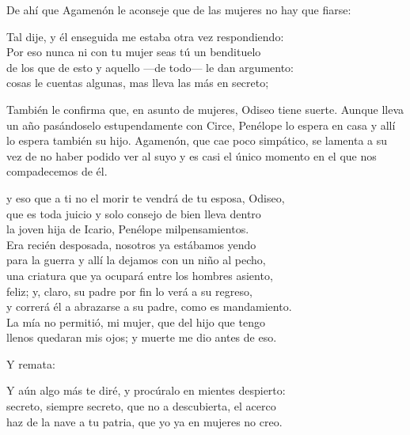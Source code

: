 De ahí que Agamenón le aconseje que de las mujeres no hay que fiarse:

\begin{versocita}
Tal dije, y él enseguida me estaba otra vez respondiendo:\\
\stanzabreak
Por eso nunca ni con tu mujer seas tú un bendituelo\\
de los que de esto y aquello ---de todo--- le dan argumento:\\
cosas le cuentas algunas, mas lleva las más en secreto;
\end{versocita}

También le confirma que, en asunto de mujeres, Odiseo tiene suerte. Aunque lleva un año pasándoselo estupendamente con Circe, Penélope lo espera en casa y allí lo espera también su hijo. Agamenón, que cae poco simpático, se lamenta a su vez de no haber podido ver al suyo y es casi el único momento en el que nos compadecemos de él.

\begin{versocita}
y eso que a ti no el morir te vendrá de tu esposa, Odiseo,\\
que es toda juicio y solo consejo de bien lleva dentro\\
la joven hija de Icario, Penélope milpensamientos.\\
Era recién desposada, nosotros ya estábamos yendo\\
para la guerra y allí la dejamos con un niño al pecho,\\
una criatura que ya ocupará entre los hombres asiento,\\
feliz; y, claro, su padre por fin lo verá a su regreso,\\
y correrá él a abrazarse a su padre, como es mandamiento.\\
La mía no permitió, mi mujer, que del hijo que tengo\\
llenos quedaran mis ojos; y muerte me dio antes de eso.
\end{versocita}

Y remata:

\begin{versocita}
Y aún algo más te diré, y procúralo en mientes despierto:\\
secreto, siempre secreto, que no a descubierta, el acerco\\
haz de la nave a tu patria, que yo ya en mujeres no creo.
\end{versocita}

